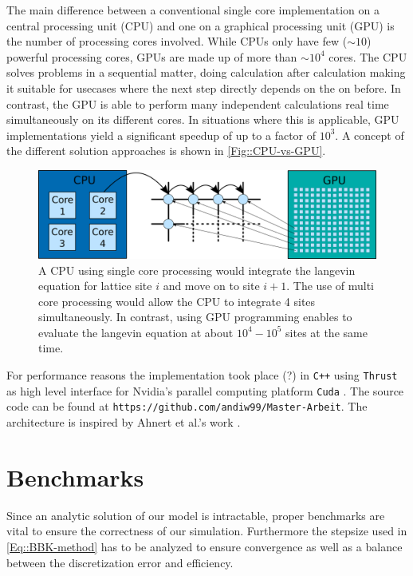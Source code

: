 	The main difference between a conventional single core implementation on a central processing unit (CPU) and one on a graphical processing unit (GPU) is the number of processing cores involved. While CPUs only have few ($\sim 10$) powerful processing cores, GPUs are made up of more than $\sim 10^4$ cores. The CPU solves problems in a sequential matter, doing calculation after calculation making it suitable for usecases where the next step directly depends on the on before. In contrast, the GPU is able to perform many independent calculations real time simultaneously on its different cores. In situations where this is applicable, GPU implementations yield a significant speedup of up to a factor of $10^3$. A concept of the different solution approaches is shown in \autoref{Fig::CPU-vs-GPU}.\\
	\begin{figure}[htp]
		\centering
		\includegraphics[width=0.8\linewidth]{graphics/CPU-vs-GPU.png}
		\caption{A CPU using single core processing would integrate the langevin equation for lattice site $i$ and move on to site $i+1$. The use of multi core processing would allow the CPU to integrate 4 sites simultaneously. In contrast, using GPU programming enables to evaluate the langevin equation at about $10^4 - 10^5$ sites at the same time.}
		\label{Fig::CPU-vs-GPU}
	\end{figure}
	
	For performance reasons the implementation took place (?) in \texttt{C++} using \texttt{Thrust} \cite{thrust} as high level interface for Nvidia's parallel computing platform \texttt{Cuda} \cite{cuda}. The source code can be found at \texttt{https://github.com/andiw99/Master-Arbeit}. The architecture is inspired by Ahnert et al.'s work \cite{ahnert2014solving}.
	\section{Benchmarks} \label{Section::Benchmarks}
	Since an analytic solution of our model is intractable, proper benchmarks are vital to ensure the correctness of our simulation. Furthermore the stepsize used in \autoref{Eq::BBK-method} has to be analyzed to ensure convergence as well as a balance between the discretization error and efficiency.
	
